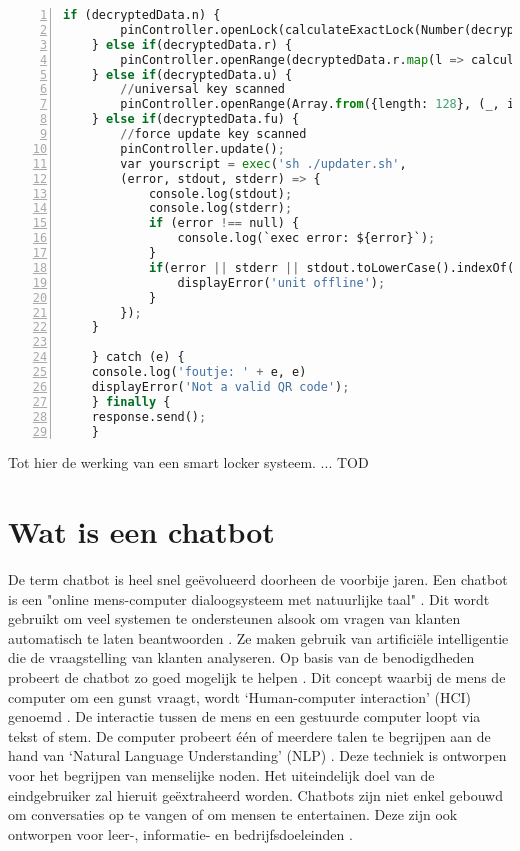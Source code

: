 \begin{lstlisting}[language=Python, caption={Openen van juiste locker of foutboodschap.}, label=lst:pythonPinController, numbers=left]
    if (decryptedData.n) {
        pinController.openLock(calculateExactLock(Number(decryptedData.n), Number(config.unit)));
    } else if(decryptedData.r) {
        pinController.openRange(decryptedData.r.map(l => calculateExactLock(Number(l), Number(config.unit))))
    } else if(decryptedData.u) {
        //universal key scanned
        pinController.openRange(Array.from({length: 128}, (_, i) => i + 1))
    } else if(decryptedData.fu) {
        //force update key scanned
        pinController.update();
        var yourscript = exec('sh ./updater.sh',
        (error, stdout, stderr) => {
            console.log(stdout);
            console.log(stderr);
            if (error !== null) {
                console.log(`exec error: ${error}`);
            }
            if(error || stderr || stdout.toLowerCase().indexOf('offline') > -1) {
                displayError('unit offline');
            }
        });
    }
    
    } catch (e) {
    console.log('foutje: ' + e, e)
    displayError('Not a valid QR code');
    } finally {
    response.send();
    }
\end{lstlisting}

    
Tot hier de werking van een smart locker systeem. ... TOD

\newpage


\section{Wat is een chatbot}%
\label{sec:chatbot}

De term chatbot is heel snel geëvolueerd doorheen de voorbije jaren. Een chatbot is een "online mens-computer dialoogsysteem met natuurlijke taal" \autocite{Jia2003}. Dit wordt gebruikt om veel systemen te ondersteunen alsook om vragen van klanten automatisch te laten beantwoorden \autocite{Adamopoulou2020}. Ze maken gebruik van artificiële intelligentie die de vraagstelling van klanten analyseren. Op basis van de benodigdheden probeert de chatbot zo goed mogelijk te helpen \autocite{Khanna2015}. Dit concept waarbij de mens de computer om een gunst vraagt, wordt ‘Human-computer interaction’ (HCI) genoemd \autocite{Adamopoulou2020}. De interactie tussen de mens en een gestuurde computer loopt via tekst of stem. De computer probeert één of meerdere talen te begrijpen aan de hand van ‘Natural Language Understanding’ (NLP) \autocite{Khanna2015a}. Deze techniek is ontworpen voor het begrijpen van menselijke noden. Het uiteindelijk doel van de eindgebruiker zal hieruit geëxtraheerd worden.  Chatbots zijn niet enkel gebouwd om conversaties op te vangen of om mensen te entertainen. Deze zijn ook ontworpen voor leer-, informatie- en bedrijfsdoeleinden \autocite{Shawar2007}. 

